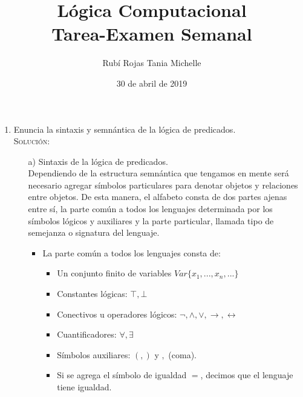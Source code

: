 \documentclass[letterpaper,11pt]{article}
\title{Lógica Computacional \\ Tarea-Examen Semanal}
\author{Rubí Rojas Tania Michelle}
\date{30 de abril de 2019}
\begin{document}
    \maketitle

    \begin{enumerate}
        \item Enuncia la sintaxis y semnántica de la lógica de predicados. \\
        \textsc{Solución:}
        \begin{itemize}
            \item[a)] Sintaxis de la lógica de predicados. \\
            Dependiendo de la estructura semnántica que tengamos en mente será
            necesario agregar símbolos particulares para denotar objetos y
            relaciones entre objetos. De esta manera, el alfabeto consta de 
            dos partes ajenas entre sí, la parte común a todos los lenguajes
            determinada por los símbolos lógicos y auxiliares y la parte 
            particular, llamada tipo de semejanza o signatura del lenguaje.
            \begin{itemize}
                \item La parte común a todos los lenguajes consta de:
                \begin{itemize}
                    \item Un conjunto finito de variables 
                    \texttt{$Var \{x_{1}, ..., x_{n},...\}$}
                    \item Constantes lógicas: $\top, \bot$
                    \item Conectivos u operadores lógicos: 
                    $\neg, \land, \lor, \rightarrow, \leftrightarrow$
                    \item Cuantificadores: $\forall, \exists$
                    \item Símbolos auxiliares: $(, )$ y $,$ (coma).
                    \item Si se agrega el símbolo de igualdad $=$, decimos
                    que el lenguaje tiene igualdad.
                \end{itemize}


\end{itemize}
\end{itemize}
\end{enumerate}
\end{document}
